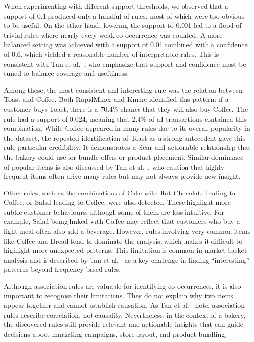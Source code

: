 \label{chap:evaluation}

When experimenting with different support thresholds, we observed that a support of 0.1 produced only a handful of 
rules, most of which were too obvious to be useful. On the other hand, lowering the support to 0.001 led to a flood 
of trivial rules where nearly every weak co-occurrence was counted. A more balanced setting was achieved with a 
support of 0.01 combined with a confidence of 0.6, which yielded a reasonable number of interpretable rules. This 
is consistent with Tan et al.~\cite[Ch.~4]{courseLitt}, who emphasize that support and confidence must be tuned to 
balance coverage and usefulness.  

Among these, the most consistent and interesting rule was the relation between Toast and Coffee. Both RapidMiner 
and Knime identified this pattern: if a customer buys Toast, there is a 70.4\% chance that they will also buy 
Coffee. The rule had a support of 0.024, meaning that 2.4\% of all transactions contained this combination. While 
Coffee appeared in many rules due to its overall popularity in the dataset, the repeated identification of Toast 
as a strong antecedent gave this rule particular credibility. It demonstrates a clear and actionable relationship 
that the bakery could use for bundle offers or product placement. Similar dominance of popular items is also 
discussed by Tan et al.~\cite[Ch.~4]{courseLitt}, who caution that highly frequent items often drive many rules but 
may not always provide new insight.  

Other rules, such as the combinations of Cake with Hot Chocolate leading to Coffee, or Salad leading to Coffee, 
were also detected. These highlight more subtle customer behaviours, although some of them are less intuitive. 
For example, Salad being linked with Coffee may reflect that customers who buy a light meal often also add a 
beverage. However, rules involving very common items like Coffee and Bread tend to dominate the analysis, which 
makes it difficult to highlight more unexpected patterns. This limitation is common in market basket analysis and 
is described by Tan et al.~\cite[Ch.~4]{courseLitt} as a key challenge in finding “interesting” patterns beyond 
frequency-based rules.  

Although association rules are valuable for identifying co-occurrences, it is also important to recognise their 
limitations. They do not explain why two items appear together and cannot establish causation. As Tan et 
al.~\cite[Ch.~4]{courseLitt} note, association rules describe correlation, not causality. Nevertheless, in the 
context of a bakery, the discovered rules still provide relevant and actionable insights that can guide decisions 
about marketing campaigns, store layout, and product bundling.  

